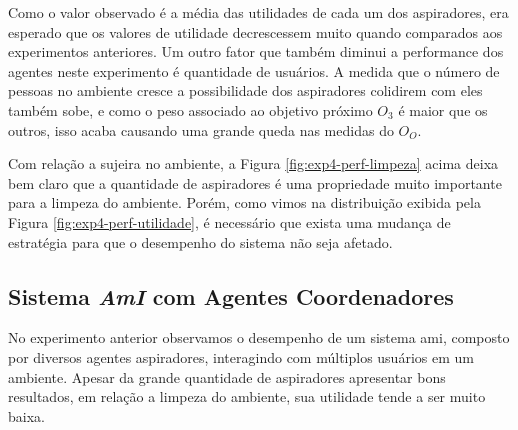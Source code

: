 Como o valor observado é a média das utilidades de cada um dos aspiradores, era esperado que os valores de utilidade decrescessem muito quando comparados aos experimentos anteriores. Um outro fator que também diminui a performance dos agentes neste experimento é quantidade de usuários. A medida que o número de pessoas no ambiente cresce a possibilidade dos aspiradores colidirem com eles também sobe, e como o peso associado ao objetivo próximo $O_3$ é maior que os outros, isso acaba causando uma grande queda nas medidas do $O_O$.

\begin{figure}[h!]
    \centering
\end{figure}

Com relação a sujeira no ambiente, a Figura \ref{fig:exp4-perf-limpeza} acima deixa bem claro que a quantidade de aspiradores é uma propriedade muito importante para a limpeza do ambiente. Porém, como vimos na distribuição exibida pela Figura \ref{fig:exp4-perf-utilidade}, é necessário que exista uma mudança de estratégia para que o desempenho do sistema não seja afetado. 

\subsection{Sistema \textit{AmI} com Agentes Coordenadores}
\label{sec:exp-coord}

No experimento anterior observamos o desempenho de um sistema \acrshort{ami}, composto por diversos agentes aspiradores, interagindo com múltiplos usuários em um ambiente. Apesar da grande quantidade de aspiradores apresentar bons resultados, em relação a limpeza do ambiente, sua utilidade tende a ser muito baixa. 

